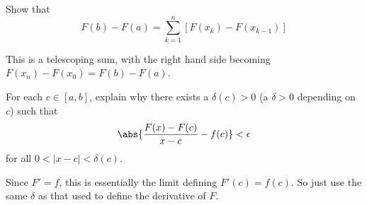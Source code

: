 \begin{exercise}
Show that
\[F(b) - F(a) = \sum^n_{k=1} [F(x_k) - F(x_{k-1})]\]
\end{exercise}
\begin{solution}
This is a telescoping sum, with the right hand side becoming \(F(x_n) - F(x_0) = F(b) - F(a)\).
\end{solution}

\begin{exercise}
For each \(c \in [a,b]\), explain why there exists a \(\delta(c) > 0\) (a \(\delta > 0\) depending on \(c\)) such that
\[\abs{\frac{F(x) - F(c)}{x-c} - f(c)} < \epsilon\]
for all \(0 < |x - c| < \delta(c)\).
\end{exercise}
\begin{solution}
Since \(F' = f\), this is essentially the limit defining \(F'(c) = f(c)\). So just use the same \(\delta\) as that used to define the derivative of \(F\).
\end{solution}
